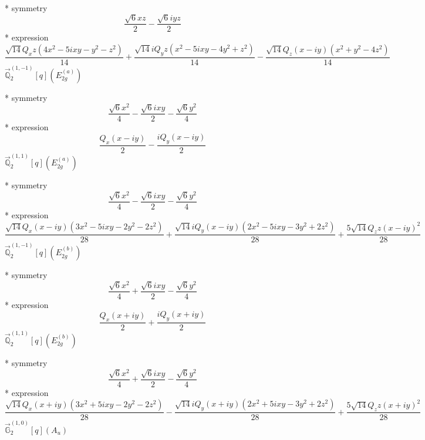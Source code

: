 \documentclass[fleqn,8pt]{jsarticle}
\begin{document}
\noindent\quad ** symmetry
\begin{dmath*}
\frac{\sqrt{6} x z}{2} - \frac{\sqrt{6} i y z}{2}
\end{dmath*}
\noindent\quad ** expression
\begin{dmath*}
\frac{\sqrt{14} Q_{x} z \left(4 x^{2} - 5 i x y - y^{2} - z^{2}\right)}{14} + \frac{\sqrt{14} i Q_{y} z \left(x^{2} - 5 i x y - 4 y^{2} + z^{2}\right)}{14} - \frac{\sqrt{14} Q_{z} \left(x - i y\right) \left(x^{2} + y^{2} - 4 z^{2}\right)}{14}
\end{dmath*}
\noindent\quad $\vec{\mathbb{Q}}_{2}^{(1,-1)}[q](E_{2g}^{(a)})$

\noindent\quad ** symmetry
\begin{dmath*}
\frac{\sqrt{6} x^{2}}{4} - \frac{\sqrt{6} i x y}{2} - \frac{\sqrt{6} y^{2}}{4}
\end{dmath*}
\noindent\quad ** expression
\begin{dmath*}
\frac{Q_{x} \left(x - i y\right)}{2} - \frac{i Q_{y} \left(x - i y\right)}{2}
\end{dmath*}
\noindent\quad $\vec{\mathbb{Q}}_{2}^{(1,1)}[q](E_{2g}^{(a)})$

\noindent\quad ** symmetry
\begin{dmath*}
\frac{\sqrt{6} x^{2}}{4} - \frac{\sqrt{6} i x y}{2} - \frac{\sqrt{6} y^{2}}{4}
\end{dmath*}
\noindent\quad ** expression
\begin{dmath*}
\frac{\sqrt{14} Q_{x} \left(x - i y\right) \left(3 x^{2} - 5 i x y - 2 y^{2} - 2 z^{2}\right)}{28} + \frac{\sqrt{14} i Q_{y} \left(x - i y\right) \left(2 x^{2} - 5 i x y - 3 y^{2} + 2 z^{2}\right)}{28} + \frac{5 \sqrt{14} Q_{z} z \left(x - i y\right)^{2}}{28}
\end{dmath*}
\noindent\quad $\vec{\mathbb{Q}}_{2}^{(1,-1)}[q](E_{2g}^{(b)})$

\noindent\quad ** symmetry
\begin{dmath*}
\frac{\sqrt{6} x^{2}}{4} + \frac{\sqrt{6} i x y}{2} - \frac{\sqrt{6} y^{2}}{4}
\end{dmath*}
\noindent\quad ** expression
\begin{dmath*}
\frac{Q_{x} \left(x + i y\right)}{2} + \frac{i Q_{y} \left(x + i y\right)}{2}
\end{dmath*}
\noindent\quad $\vec{\mathbb{Q}}_{2}^{(1,1)}[q](E_{2g}^{(b)})$

\noindent\quad ** symmetry
\begin{dmath*}
\frac{\sqrt{6} x^{2}}{4} + \frac{\sqrt{6} i x y}{2} - \frac{\sqrt{6} y^{2}}{4}
\end{dmath*}
\noindent\quad ** expression
\begin{dmath*}
\frac{\sqrt{14} Q_{x} \left(x + i y\right) \left(3 x^{2} + 5 i x y - 2 y^{2} - 2 z^{2}\right)}{28} - \frac{\sqrt{14} i Q_{y} \left(x + i y\right) \left(2 x^{2} + 5 i x y - 3 y^{2} + 2 z^{2}\right)}{28} + \frac{5 \sqrt{14} Q_{z} z \left(x + i y\right)^{2}}{28}
\end{dmath*}
\noindent\quad $\vec{\mathbb{G}}_{2}^{(1,0)}[q](A_{u})$
\end{document}
